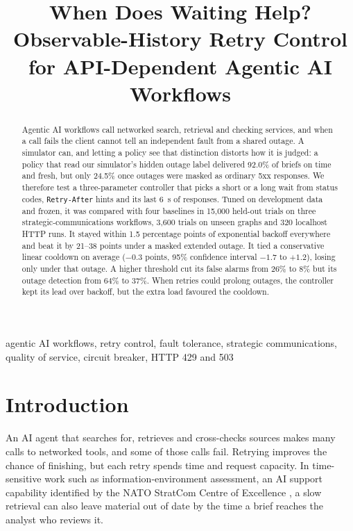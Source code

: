 \documentclass[conference,a4paper]{IEEEtran}
\begin{document}
\title{When Does Waiting Help? Observable-History Retry Control for API-Dependent Agentic AI Workflows}
\author{}
\maketitle
\begin{abstract}
Agentic AI workflows call networked search, retrieval and checking services, and when a call fails the client cannot tell an independent fault from a shared outage. A simulator can, and letting a policy see that distinction distorts how it is judged: a policy that read our simulator's hidden outage label delivered 92.0\% of briefs on time and fresh, but only 24.5\% once outages were masked as ordinary 5xx responses. We therefore test a three-parameter controller that picks a short or a long wait from status codes, \texttt{Retry-After} hints and its last 6~s of responses. Tuned on development data and frozen, it was compared with four baselines in 15,000 held-out trials on three strategic-communications workflows, 3,600 trials on unseen graphs and 320 localhost HTTP runs. It stayed within 1.5 percentage points of exponential backoff everywhere and beat it by 21--38 points under a masked extended outage. It tied a conservative linear cooldown on average ($-0.3$ points, 95\% confidence interval $-1.7$ to $+1.2$), losing only under that outage. A higher threshold cut its false alarms from 26\% to 8\% but its outage detection from 64\% to 37\%. When retries could prolong outages, the controller kept its lead over backoff, but the extra load favoured the cooldown.
\end{abstract}

\begin{IEEEkeywords}
agentic AI workflows, retry control, fault tolerance, strategic communications, quality of service, circuit breaker, HTTP 429 and 503
\end{IEEEkeywords}

\section{Introduction}
An AI agent that searches for, retrieves and cross-checks sources makes many calls to networked tools, and some of those calls fail. Retrying improves the chance of finishing, but each retry spends time and request capacity. In time-sensitive work such as information-environment assessment, an AI support capability identified by the NATO StratCom Centre of Excellence \cite{nato}, a slow retrieval can also leave material out of date by the time a brief reaches the analyst who reviews it.
\end{document}
